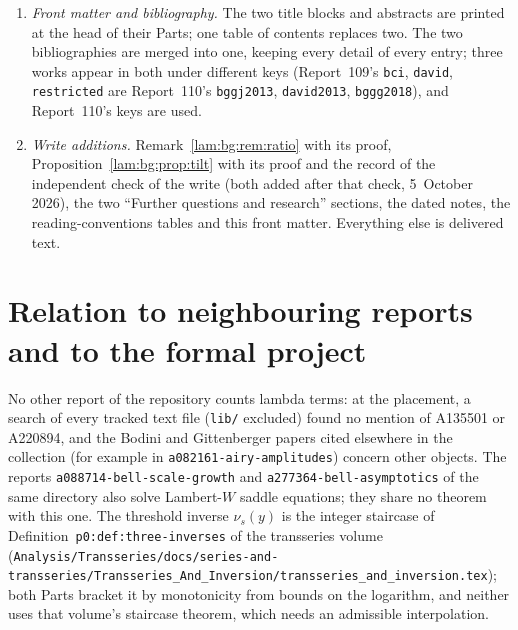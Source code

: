 \documentclass[11pt,a4paper]{article}
\numberwithin{equation}{section}
\theoremstyle{remark}
\newcommand{\file}[1]{\nolinkurl{#1}}
\begin{document}
\begin{enumerate}
\item \emph{Front matter and bibliography.} The two title blocks and abstracts are printed at the head of their Parts; one table of contents replaces two. The two bibliographies are merged into one, keeping every detail of every entry; three works appear in both under different keys (Report~109's \texttt{bci}, \texttt{david}, \texttt{restricted} are Report~110's \texttt{bggj2013}, \texttt{david2013}, \texttt{bggg2018}), and Report~110's keys are used.
\item \emph{Write additions.} Remark~\ref{lam:bg:rem:ratio} with its proof, Proposition~\ref{lam:bg:prop:tilt} with its proof and the record of the independent check of the write (both added after that check, 5~October 2026), the two ``Further questions and research'' sections, the dated notes, the reading-conventions tables and this front matter. Everything else is delivered text.
\end{enumerate}

\section*{Relation to neighbouring reports and to the formal project}\label{lam:sec:neighbours}
No other report of the repository counts lambda terms: at the placement, a search of every tracked text file (\file{lib/} excluded) found no mention of A135501 or A220894, and the Bodini and Gittenberger papers cited elsewhere in the collection (for example in \file{a082161-airy-amplitudes}) concern other objects. The reports \file{a088714-bell-scale-growth} and \file{a277364-bell-asymptotics} of the same directory also solve Lambert-$W$ saddle equations; they share no theorem with this one. The threshold inverse $\nu_s(y)$ is the integer staircase of Definition~\texttt{p0:def:three-inverses} of the transseries volume (\file{Analysis/Transseries/docs/series-and-transseries/Transseries_And_Inversion/transseries_and_inversion.tex}); both Parts bracket it by monotonicity from bounds on the logarithm, and neither uses that volume's staircase theorem, which needs an admissible interpolation.
\end{document}
